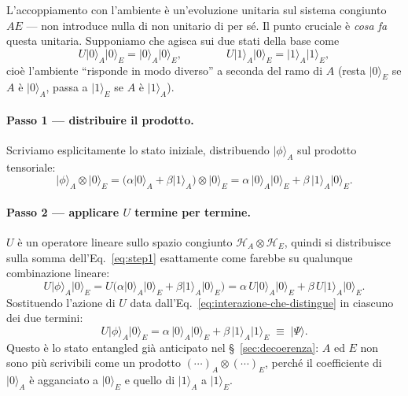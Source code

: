 \documentclass[11pt,a4paper]{article}
\newcommand{\ket}[1]{\lvert #1 \rangle}
\begin{document}
L'accoppiamento con l'ambiente è un'evoluzione unitaria sul sistema congiunto $AE$ ---
non introduce nulla di non unitario di per sé. Il punto cruciale è \emph{cosa fa}
questa unitaria. Supponiamo che agisca sui due stati della base come
\begin{equation}
U\ket{0}_A\ket{0}_E = \ket{0}_A\ket{0}_E, \qquad\qquad
U\ket{1}_A\ket{0}_E = \ket{1}_A\ket{1}_E,
\label{eq:interazione-che-distingue}
\end{equation}
cioè l'ambiente ``risponde in modo diverso'' a seconda del ramo di $A$ (resta $\ket0_E$
se $A$ è $\ket0_A$, passa a $\ket1_E$ se $A$ è $\ket1_A$).

\paragraph{Passo 1 --- distribuire il prodotto.} Scriviamo esplicitamente lo stato
iniziale, distribuendo $\ket\phi_A$ sul prodotto tensoriale:
\begin{equation}
\ket\phi_A\otimes\ket0_E = \big(\alpha\ket0_A+\beta\ket1_A\big)\otimes\ket0_E
= \alpha\,\ket0_A\ket0_E + \beta\,\ket1_A\ket0_E.
\label{eq:step1}
\end{equation}

\paragraph{Passo 2 --- applicare $U$ termine per termine.} $U$ è un operatore lineare
sullo spazio congiunto $\mathcal H_A\otimes\mathcal H_E$, quindi si distribuisce sulla
somma dell'Eq.~\eqref{eq:step1} esattamente come farebbe su qualunque combinazione
lineare:
\begin{equation}
U\ket\phi_A\ket0_E = U\big(\alpha\ket0_A\ket0_E+\beta\ket1_A\ket0_E\big)
= \alpha\,U\ket0_A\ket0_E + \beta\,U\ket1_A\ket0_E.
\label{eq:step2}
\end{equation}
Sostituendo l'azione di $U$ data dall'Eq.~\eqref{eq:interazione-che-distingue} in
ciascuno dei due termini:
\begin{equation}
U\ket\phi_A\ket0_E = \alpha\,\ket0_A\ket0_E + \beta\,\ket1_A\ket1_E \;\equiv\; \ket\Psi.
\label{eq:step3}
\end{equation}
Questo è lo stato entangled già anticipato nel \S~\ref{sec:decoerenza}: $A$ ed $E$ non
sono più scrivibili come un prodotto $(\cdots)_A\otimes(\cdots)_E$, perché il
coefficiente di $\ket0_A$ è agganciato a $\ket0_E$ e quello di $\ket1_A$ a $\ket1_E$.
\end{document}
